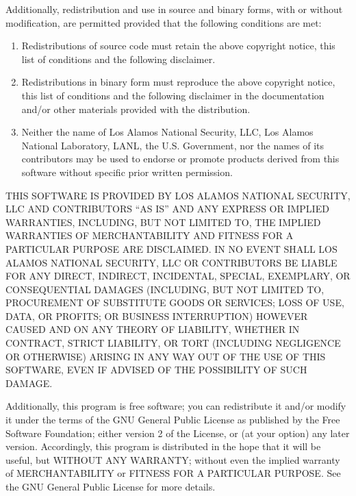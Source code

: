 \documentclass[letterpaper,10pt,english]{sphinxmanual}
\begin{document}
Additionally, redistribution and use in source and binary forms, with or without modification, are permitted provided that the following conditions are met:
\begin{enumerate}
\item {} 
Redistributions of source code must retain the above copyright notice, this list of conditions and the following disclaimer.

\item {} 
Redistributions in binary form must reproduce the above copyright notice, this list of conditions and the following disclaimer in the documentation and/or other materials provided with the distribution.

\item {} 
Neither the name of Los Alamos National Security, LLC, Los Alamos National Laboratory, LANL, the U.S. Government, nor the names of its contributors may be used to endorse or promote products derived from this software without specific prior written permission.

\end{enumerate}

THIS SOFTWARE IS PROVIDED BY LOS ALAMOS NATIONAL SECURITY, LLC AND CONTRIBUTORS “AS IS” AND ANY EXPRESS OR IMPLIED WARRANTIES, INCLUDING, BUT NOT LIMITED TO, THE IMPLIED WARRANTIES OF MERCHANTABILITY AND FITNESS FOR A PARTICULAR PURPOSE ARE DISCLAIMED. IN NO EVENT SHALL LOS ALAMOS NATIONAL SECURITY, LLC OR CONTRIBUTORS BE LIABLE FOR ANY DIRECT, INDIRECT, INCIDENTAL, SPECIAL, EXEMPLARY, OR CONSEQUENTIAL DAMAGES (INCLUDING, BUT NOT LIMITED TO, PROCUREMENT OF SUBSTITUTE GOODS OR SERVICES; LOSS OF USE, DATA, OR PROFITS; OR BUSINESS INTERRUPTION) HOWEVER CAUSED AND ON ANY THEORY OF LIABILITY, WHETHER IN CONTRACT, STRICT LIABILITY, OR TORT (INCLUDING NEGLIGENCE OR OTHERWISE) ARISING IN ANY WAY OUT OF THE USE OF THIS SOFTWARE, EVEN IF ADVISED OF THE POSSIBILITY OF SUCH DAMAGE.

Additionally, this program is free software; you can redistribute it and/or
modify it under the terms of the GNU General Public License as published by
the Free Software Foundation; either version 2 of the License, or (at your
option) any later version. Accordingly, this program is distributed in the
hope that it will be useful, but WITHOUT ANY WARRANTY; without even the
implied warranty of MERCHANTABILITY or FITNESS FOR A PARTICULAR PURPOSE.
See the GNU General Public License for more details.
\end{document}

